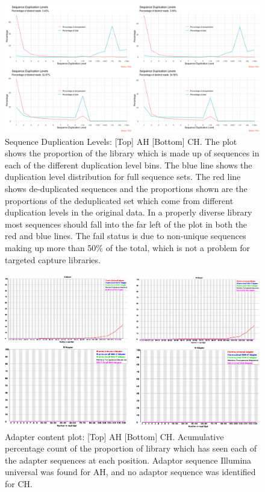 \documentclass{article}
\begin{document}
\begin{figure}[h] \hspace*{0cm} 
\begin{center}
    \includegraphics[scale=0.25]{fastqcr/p5}
	\caption{Sequence Duplication Levels:  [Top] AH [Bottom] CH.
	The plot shows the proportion of the library which is made up of sequences in each of the different duplication level bins. 
	The blue line shows the duplication level distribution for full sequence sets. 
	The red line shows de-duplicated sequences and the proportions shown are the proportions of the deduplicated set which come from different duplication levels in the original data.
In a properly diverse library most sequences should fall into the far left of the plot in both the red and blue lines.
The fail status is due to non-unique sequences making up more than 50\% of the total, which is not a problem for targeted capture libraries.}
	\label{fig:p5}
\end{center}
\end{figure}

\begin{figure}[h] \hspace*{0cm} 
\begin{center}
    \includegraphics[scale=0.4]{fastqc/p6}
	\caption{Adapter content plot:  [Top] AH [Bottom] CH. Acumulative percentage count of the proportion of library which has seen each of the adapter sequences at each position. Adaptor sequence Illumina universal was found for AH, and no adaptor sequence was identified for CH. }
	\label{fig:p6}
\end{center}
\end{figure}
\end{document}

